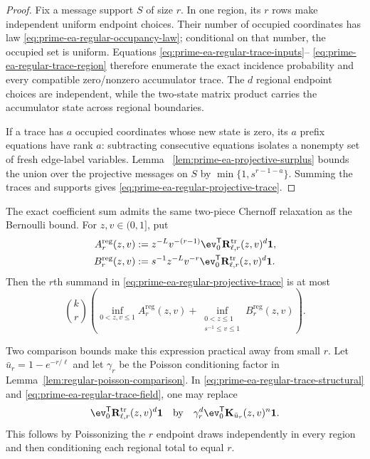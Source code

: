 \begin{proof}
Fix a message support $S$ of size $r$.  In one region, its $r$ rows make
independent uniform endpoint choices.  Their number of occupied coordinates
has law \eqref{eq:prime-ea-regular-occupancy-law}; conditional on that number,
the occupied set is uniform.  Equations
\eqref{eq:prime-ea-regular-trace-inputs}--
\eqref{eq:prime-ea-regular-trace-region} therefore enumerate the exact
incidence probability and every compatible zero/nonzero accumulator trace.
The $d$ regional endpoint choices are independent, while the two-state matrix
product carries the accumulator state across regional boundaries.

If a trace has $a$ occupied coordinates whose new state is zero, its $a$
prefix equations have rank $a$: subtracting consecutive equations isolates a
nonempty set of fresh edge-label variables.  Lemma~
\ref{lem:prime-ea-projective-surplus} bounds the union over the projective
messages on $S$ by $\min\{1,s^{r-1-a}\}$.  Summing the traces and supports
gives \eqref{eq:prime-ea-regular-projective-trace}.
\end{proof}

The exact coefficient sum admits the same two-piece Chernoff relaxation as
the Bernoulli bound.  For $z,v\in(0,1]$, put
\begin{align}
 A^{\mathrm{reg}}_r(z,v)
 &:=z^{-L}v^{-(r-1)}\ev_0^{\mathsf T}
   \mathbf R^{\mathrm{tr}}_{\ell,r}(z,v)^d\boldsymbol 1,
 \label{eq:prime-ea-regular-trace-structural}\\
 B^{\mathrm{reg}}_r(z,v)
 &:=s^{-1}z^{-L}v^{-r}\ev_0^{\mathsf T}
   \mathbf R^{\mathrm{tr}}_{\ell,r}(z,v)^d\boldsymbol 1.
 \label{eq:prime-ea-regular-trace-field}
\end{align}
Then the $r$th summand in
\eqref{eq:prime-ea-regular-projective-trace} is at most
\begin{equation}
 \binom{k}{r}\left(
  \inf_{0<z,v\leq1}A^{\mathrm{reg}}_r(z,v)
  +\inf_{\substack{0<z\leq1\\s^{-1}\leq v\leq1}}
   B^{\mathrm{reg}}_r(z,v)
 \right).
 \label{eq:prime-ea-regular-trace-chernoff}
\end{equation}

Two comparison bounds make this expression practical away from small $r$.
Let $\bar u_r=1-e^{-r/\ell}$ and let $\gamma_r$ be the Poisson conditioning
factor in Lemma~\ref{lem:regular-poisson-comparison}.  In
\eqref{eq:prime-ea-regular-trace-structural} and
\eqref{eq:prime-ea-regular-trace-field}, one may replace
\begin{equation}
 \ev_0^{\mathsf T}\mathbf R^{\mathrm{tr}}_{\ell,r}(z,v)^d
 \boldsymbol 1
 \quad\hbox{by}\quad
 \gamma_r^d\ev_0^{\mathsf T}\mathbf K_{\bar u_r}(z,v)^n\boldsymbol 1.
 \label{eq:prime-ea-regular-trace-poisson}
\end{equation}
This follows by Poissonizing the $r$ endpoint draws independently in every
region and then conditioning each regional total to equal $r$.

